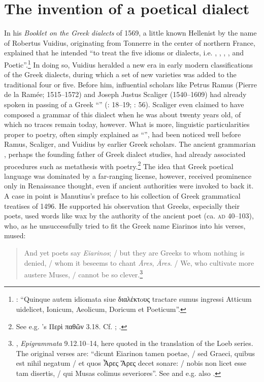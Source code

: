 \section{The invention of a poetical dialect}\label{sec:2.7}

In his \textit{Booklet on the Greek dialects} of 1569, a little known  Hellenist by the  name of Robertus Vuidius, originating from Tonnerre in the center of northern France, explained that he intended “to treat the five idioms or dialects, i.e. , , , , and Poetic”.\footnote{\citet[137\textsc{\textsuperscript{v}}]{Vuidius1569}: “Quinque autem idiomata siue διαλέκτoυς tractare sumus ingressi Atticum uidelicet, Ionicum, Aeolicum, Doricum et Poeticum”.} In doing so, Vuidius heralded a new era in early modern classifications of the Greek dialects, during which a set of new varieties was added to the traditional four or five. Before him, influential scholars like Petrus Ramus (Pierre de la Ramée; 1515–1572) and Joseph Justus Scaliger (1540–1609) had already spoken in passing of a Greek “” (\citealt{Ramus1560}: 18–19; \citealt{Scaliger1594}: 56). Scaliger even claimed to have composed a grammar of this dialect when he was about twenty years old, of which no traces remain today, however. What is more, linguistic particularities proper to poetry, often simply explained as “”, had been noticed well before Ramus, Scaliger, and Vuidius by earlier Greek scholars. The ancient grammarian , perhaps the founding father of Greek dialect studies, had already associated procedures such as metathesis with poetry.\footnote{See e.g. ’s Περὶ παθῶν 3.18. Cf. ; \citet[209, 230, 235]{Vergara1537}.} The idea that Greek poetical language was dominated by a far-ranging license, however, received prominence only in Renaissance thought, even if ancient authorities were invoked to back it. A case in point is Manutius’s preface to his collection of Greek grammatical treatises of 1496. He supported his observation that Greeks, especially their poets, used words like wax by the authority of the ancient  poet  (ca. \textsc{ad} 40–103), who, as he unsuccessfully tried to fit the Greek name Eiarinos into his  verses, mused:

\begin{quote}
And yet poets say \textit{Eiarinos}; / but they are Greeks to whom nothing is denied, / whom it beseems to chant \textit{Āres}, \textit{Ăres}. / We, who cultivate more austere Muses, / cannot be so clever.\footnote{, \textit{Epigrammata} 9.12.10–14, here quoted in the  translation of the Loeb series. The original  verses are: “dicunt Eiarinon tamen poetae, / sed Graeci, quibus est nihil negatum / et quos Ἆρες Ἄρες decet sonare: / nobis non licet esse tam disertis, / qui Musas colimus severiores”. See \citet[*.ii\textsc{\textsuperscript{v}}]{Manutius1496Aldus} and e.g. also \citet[187\textsc{\textsuperscript{r}}]{Enoch1555}.}
\end{quote}

